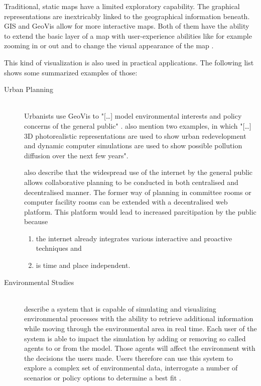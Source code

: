Traditional, static maps have a limited exploratory capability. The graphical representations are inextricably linked to the geographical information beneath. \ac{GIS} and \ac{GeoVis} allow for more interactive maps. Both of them have the ability to extend the basic layer of a map with user-experience abilities like for example zooming in or out and to change the visual appearance of the map .

This kind of visualization is also used in practical applications. The following list shows some summarized examples of those:
\begin{description}

\item[Urban Planning] \hfill \\
Urbanists use \ac{GeoVis} to "[\ldots] model environmental interests and policy concerns of the general public" . \citeauthor{Jiang2003} also mention two examples, in which "[\ldots] 3D photorealistic representations are used to show urban redevelopment and dynamic computer simulations are used to show possible pollution diffusion over the next few years".

\citeauthor{Jiang2003} also describe that the widespread use of the internet by the general public allows collaborative planning to be conducted in both centralised and decentralised manner. The former way of planning in committee rooms or computer facility rooms can be extended with a decentralised web platform. This platform would lead to increased parcitipation by the public because
\begin{enumerate}
\item the internet already integrates various interactive and proactive techniques and
\item is time and place independent.
\end{enumerate}

\item[Environmental Studies] \hfill \\
\citeauthor{Danado2005} describe a system that is capable of simulating and visualizing environmental processes with the ability to retrieve additional information while moving through the environmental area in real time. Each user of the system is able to impact the simulation by adding or removing so called agents to or from the model. Those agents will affect the environment with the decisions the users made. Users therefore can use this system to explore a complex set of environmental data, interrogate a number of scenarios or policy options to determine a best fit .


\end{description}
